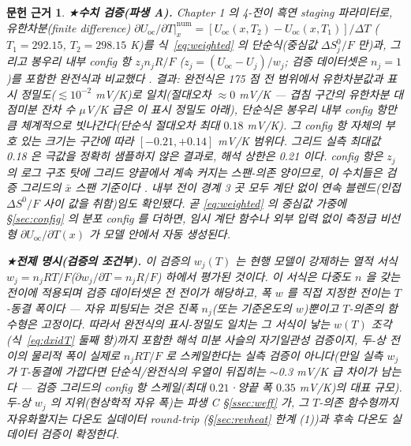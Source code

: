 \documentclass[11pt,a4paper]{article}
\newtheorem*{srcbox}{문헌 근거}
\newcommand{\oc}{\mathrm{oc}}
\begin{document}
\begin{srcbox}
★\textbf{수치 검증(파생 A).} Chapter 1 의 4-전이 흑연 staging 파라미터로,
유한차분(finite difference) $\partial U_\oc/\partial T|_x^\mathrm{num}=[U_\oc(x,T_2)-U_\oc(x,T_1)]/\Delta T$ ($T_1{=}292.15$,
$T_2{=}298.15$ K)를 식~\eqref{eq:weighted} 의 \emph{단순식}(중심값 $\Delta S^0_j/F$ 만)과, 그리고 봉우리 내부
config 항 $z_j n_jR/F$ ($z_j=(U_\oc-U_j)/w_j$; 검증 데이터셋은 $n_j{=}1$)를 포함한 \emph{완전식}과 비교했다 \cite{numverif2026}. 결과:
완전식은 175 점 전 범위에서 유한차분값과 표시 정밀도($\lesssim10^{-2}$ mV/K)로 일치(절대오차 $\approx0$ mV/K —
겹침 구간의 유한차분 대 점미분 잔차 수 $\mu$V/K 급은 이 표시 정밀도 아래), 단순식은 봉우리
내부 config 항만큼 체계적으로 빗나간다(단순식 절대오차 최대 $0.18$ mV/K). 그 config 항 자체의 부호 있는 크기는
구간에 따라 $[-0.21,+0.14]$ mV/K 범위다. 그리드 실측 최대값 0.18 은 극값을 정확히 샘플하지 않은 결과로,
해석 상한은 0.21 이다. config 항은 $z_j$ 의 로그 구조 탓에 그리드 양끝에서 계속 커지는 스팬-의존 양이므로,
이 수치들은 검증 그리드의 $\bar x$ 스팬 기준이다 \cite{numverif2026}. 내부 전이 경계 3 곳 모두 \emph{계단 없이} 연속 블렌드(인접 $\Delta S^0/F$
사이 값을 취함)임도 확인됐다. 곧 \eqref{eq:weighted} 의 중심값 가중에 \S\ref{sec:config} 의
분포 config 를 더하면, 임시 계단 함수나 외부 입력 없이 \emph{측정급 비선형} $\partial U_\oc/\partial T(x)$ 가
모델 안에서 자동 생성된다.

★\textbf{전제 명시(검증의 조건부).} 이 검증의 $w_j(T)$ 는 현행 모델이
강제하는 열적 서식 $w_j=n_jRT/F$($\partial w_j/\partial T=n_jR/F$) 하에서 평가된 것이다. 이 서식은 다중도 $n$ 을 갖는
전이에 적용되며 검증 데이터셋은 전 전이가 해당하고, 폭 $w$ 를 직접 지정한 전이는 $T$-동결 폭이다 —
자유 피팅되는 것은 진폭 $n_j$(또는 기준온도의 $w$)뿐이고 $T$-의존의 함수형은 고정이다. 따라서 완전식의 표시-정밀도 일치는 그 서식이 낳는 $w(T)$ 조각
(식~\eqref{eq:dxidT} 둘째 항)까지 포함한 \emph{해석 미분 사슬의 자기일관성} 검증이지, 두-상 전이의
물리적 폭이 실제로 $n_jRT/F$ 로 스케일한다는 \emph{실측 검증이 아니다}(만일 실측 $w_j$ 가 $T$-동결에
가깝다면 단순식/완전식의 우열이 뒤집히는 $\sim$0.3 mV/K 급 차이가 남는다 — 검증 그리드의 config 항
스케일(최대 $0.21$·양끝 폭 $0.35$ mV/K)의 대표 규모). 두-상 $w_j$ 의 지위(현상학적
자유 폭)는 파생 C \S\ref{ssec:weff} 가, 그 $T$-의존 함수형까지 자유화할지는 다온도 실데이터 round-trip
(\S\ref{sec:revheat} 한계 (1))과 후속 다온도 실데이터 검증이 확정한다.
\end{srcbox}
\end{document}
